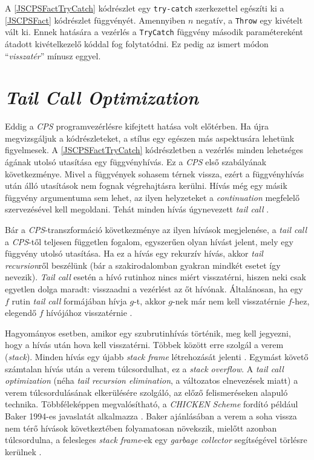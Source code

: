 A \ref{JSCPSFactTryCatch} kódrészlet egy \texttt{try-catch} szerkezettel egészíti ki a \ref{JSCPSFact} kódrészlet függvényét. Amennyiben $n$ negatív, a \texttt{Throw} egy kivételt vált ki. Ennek hatására a vezérlés a \texttt{TryCatch} függvény második paramétereként átadott kivételkezelő kóddal fog folytatódni. Ez pedig az ismert módon ``\textit{visszatér}'' mínusz eggyel.

\section{\textit{Tail Call Optimization}}

Eddig a \textit{CPS} programvezérlésre kifejtett hatása volt előtérben. Ha újra megvizsgáljuk a kódrészleteket, a stílus egy egészen más aspektusára lehetünk figyelmesek. A \ref{JSCPSFactTryCatch} kódrészletben a vezérlés minden lehetséges ágának utolsó utasítása egy függvényhívás. Ez a \textit{CPS} első szabályának következménye. Mivel a függvények sohasem térnek vissza, ezért a függvényhívás után álló utasítások nem fognak végrehajtásra kerülni. Hívás még egy másik függvény argumentuma sem lehet, az ilyen helyzeteket a \textit{continuation} megfelelő szervezésével kell megoldani. Tehát minden hívás úgynevezett \textit{tail call} \cite{CompCont}.

Bár a \textit{CPS}-transzformáció következménye az ilyen hívások megjelenése, a \textit{tail call} a \textit{CPS}-től teljesen független fogalom, egyszerűen olyan hívást jelent, mely egy függvény utolsó utasítása. Ha ez a hívás egy rekurzív hívás, akkor \textit{tail recursion}ről beszélünk (bár a szakirodalomban gyakran mindkét esetet így nevezik). \textit{Tail call} esetén a hívó rutinhoz nincs miért visszatérni, hiszen neki csak egyetlen dolga maradt: visszaadni a vezérlést az őt hívónak. Általánosan, ha egy $f$ rutin \textit{tail call} formájában hívja $g$-t, akkor $g$-nek már nem kell visszatérnie $f$-hez, elegendő $f$ hívójához visszatérnie \cite{CompCont}. 

Hagyományos esetben, amikor egy szubrutinhívás történik, meg kell jegyezni, hogy a hívás után hova kell visszatérni. Többek között erre szolgál a verem (\textit{stack}). Minden hívás egy újabb \textit{stack frame} létrehozását jelenti \cite{EssProgLan}. Egymást követő számtalan hívás után a verem túlcsordulhat, ez a \textit{stack overflow}. A \textit{tail call optimization} (néha \textit{tail recursion elimination}, a változatos elnevezések miatt) a verem túlcsordulásának elkerülésére szolgáló, az előző felismeréseken alapuló technika. Többféleképpen megvalósítható, a \textit{CHICKEN} \textit{Scheme} fordító például Baker 1994-es javaslatát alkalmazza \cite{ChickenCompilation}. Baker ajánlásában a verem a soha vissza nem térő hívások következtében folyamatosan növekszik, mielőtt azonban túlcsordulna, a felesleges \textit{stack frame}-ek egy \textit{garbage collector} segítségével törlésre kerülnek \cite{CheneyOnTheMTA}.

